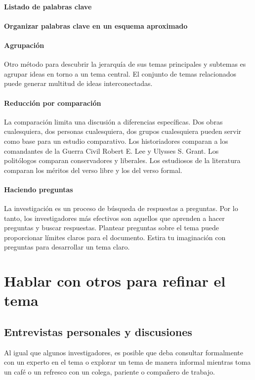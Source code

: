 \paragraph{Listado de palabras clave}

\paragraph{Organizar palabras clave en un esquema aproximado}

\paragraph{Agrupación}
Otro método para descubrir la jerarquía de sus temas principales y subtemas es agrupar ideas en torno a un tema central. El conjunto de temas relacionados puede generar multitud de ideas interconectadas.

\paragraph{Reducción por comparación }
La comparación limita una discusión a diferencias específicas. Dos obras cualesquiera, dos personas cualesquiera, dos grupos cualesquiera pueden servir como base para un estudio comparativo. Los historiadores comparan a los comandantes de la Guerra Civil Robert E. Lee y Ulysses S. Grant. Los politólogos comparan conservadores y liberales. Los estudiosos de la literatura comparan los méritos del verso libre y los del verso formal.

\paragraph{Haciendo preguntas}
La investigación es un proceso de búsqueda de respuestas a preguntas. Por lo tanto, los investigadores más efectivos son aquellos que aprenden a hacer preguntas y buscar respuestas. Plantear preguntas sobre el tema puede proporcionar límites claros para el documento. Estira tu imaginación con preguntas para desarrollar un tema claro.


\section{Hablar con otros para refinar el tema}
\subsection{Entrevistas personales y discusiones}
Al igual que algunos investigadores, es posible que deba consultar formalmente con un experto en el tema o explorar un tema de manera informal mientras toma un café o un refresco con un colega, pariente o compañero de trabajo.


